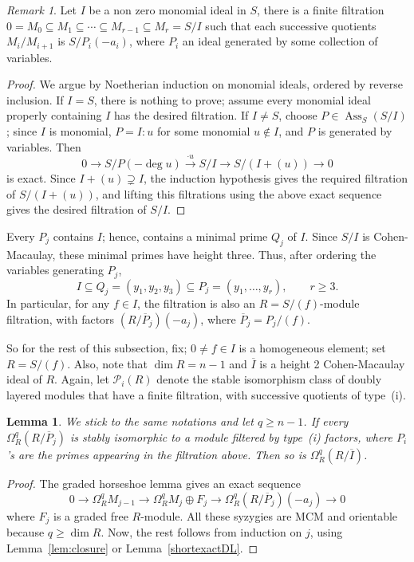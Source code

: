 \documentclass[11pt,letterpaper]{amsart}
\newcommand{\seq}{\subseteq}
\DeclareMathOperator{\Ass}{Ass}
\theoremstyle{plain}
\newtheorem{lem}[thm]{Lemma}
\theoremstyle{definition}
\theoremstyle{remark}
\newtheorem{remark}[thm]{Remark}
\begin{document}
\begin{remark}\label{primefiltrationformonomialideals}
    Let $I$ be a non zero monomial ideal in $S$, there is a finite filtration $0=M_0\seq M_{1}\seq\cdots\seq M_{r-1}\seq M_r=S/I$ such that each successive quotients $M_i/M_{i+1}$ is $S/P_i(-a_i)$, where $P_i$ an ideal generated by some collection of variables.
\end{remark}
\begin{proof}
We argue by Noetherian induction on monomial ideals, ordered by reverse inclusion. If \(I=S\), there is nothing to prove; assume every monomial ideal properly containing \(I\) has the desired filtration. If \(I\neq S\), choose \(P\in\Ass_S(S/I)\); since \(I\) is monomial, \(P=I:u\) for some monomial \(u\notin I\), and \(P\) is generated by variables. Then
\[
0\longrightarrow S/P(-\deg u)\xrightarrow{\cdot u} S/I\longrightarrow S/(I+(u))\longrightarrow0
\]
is exact. Since \(I+(u)\supsetneq I\), the induction hypothesis gives the required filtration of \(S/(I+(u))\), and lifting this filtrations using the  above exact sequence gives the desired filtration of \(S/I\).
\end{proof}

Every $P_j$ contains $I$; hence, contains a minimal prime $Q_j$ of $I$.
Since $S/I$ is Cohen-Macaulay, these minimal primes have height three. Thus, after ordering the variables generating $P_j$,
\[
 I\subseteq Q_j=(y_1,y_2,y_3)\subseteq
 P_j=(y_1,\ldots,y_r),\qquad r\ge3.
\]
In particular, for any $f\in I$, the filtration is also an $R=S/(f)$-module filtration, with factors
$(R/\overline P_j)(-a_j)$, where $\overline P_j=P_j/(f)$.


So for the rest of this subsection, fix; $0\neq f\in I$ is a homogeneous element; set $R=S/(f)$. Also, note that $\dim R=n-1$ and $\overline{I}$ is a height 2 Cohen-Macaulay ideal of $R$. Again, let $\mathcal{P}_{i}(R)$ denote the stable isomorphism class of doubly layered modules that have a finite filtration, with successive quotients of type~(i).

\begin{lem}\label{lem:filtration}We stick to the same notations and let $q\ge n-1$. If every $\Omega_R^q(R/\overline P_j)$ is stably
isomorphic to a module filtered by type~(i) factors,  where $P_i$'s are the primes appearing in the filtration above. Then so is
$\Omega_R^q(R/\overline{I})$.
\end{lem}
\begin{proof}
The graded horseshoe lemma gives an exact sequence
\[
0\longrightarrow\Omega_R^qM_{j-1}
\longrightarrow\Omega_R^qM_j\oplus F_j
\longrightarrow\Omega_R^q(R/\overline P_j)(-a_j)\longrightarrow0
\] where $F_j$ is a graded free $R$-module. All these syzygies are MCM and orientable because $q\ge\dim R$. Now, the rest follows from induction on $j$, using Lemma~\ref{lem:closure} or Lemma~\ref{shortexactDL}.
\end{proof}
\end{document}
